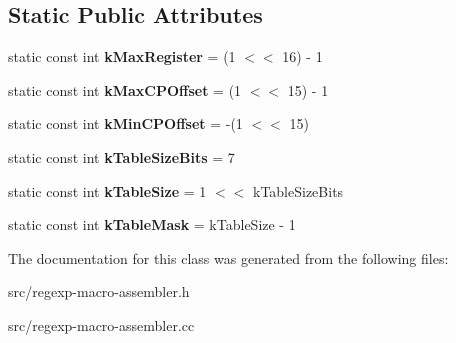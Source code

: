 \subsection*{Static Public Attributes}
\begin{DoxyCompactItemize}
\item 
\hypertarget{classv8_1_1internal_1_1_reg_exp_macro_assembler_aab3ae21c4255e84293d23f61d9916cbf}{}static const int {\bfseries k\+Max\+Register} = (1 $<$$<$ 16) -\/ 1\label{classv8_1_1internal_1_1_reg_exp_macro_assembler_aab3ae21c4255e84293d23f61d9916cbf}

\item 
\hypertarget{classv8_1_1internal_1_1_reg_exp_macro_assembler_ab05cfb65132cef288534e395a058d773}{}static const int {\bfseries k\+Max\+C\+P\+Offset} = (1 $<$$<$ 15) -\/ 1\label{classv8_1_1internal_1_1_reg_exp_macro_assembler_ab05cfb65132cef288534e395a058d773}

\item 
\hypertarget{classv8_1_1internal_1_1_reg_exp_macro_assembler_a70bb0c9a038cdaff24b24f4af8fd9586}{}static const int {\bfseries k\+Min\+C\+P\+Offset} = -\/(1 $<$$<$ 15)\label{classv8_1_1internal_1_1_reg_exp_macro_assembler_a70bb0c9a038cdaff24b24f4af8fd9586}

\item 
\hypertarget{classv8_1_1internal_1_1_reg_exp_macro_assembler_a8718bcee67dbdf905a30f8e81dfce44f}{}static const int {\bfseries k\+Table\+Size\+Bits} = 7\label{classv8_1_1internal_1_1_reg_exp_macro_assembler_a8718bcee67dbdf905a30f8e81dfce44f}

\item 
\hypertarget{classv8_1_1internal_1_1_reg_exp_macro_assembler_aed8b41d2ad7dc04d332f8051017a12ea}{}static const int {\bfseries k\+Table\+Size} = 1 $<$$<$ k\+Table\+Size\+Bits\label{classv8_1_1internal_1_1_reg_exp_macro_assembler_aed8b41d2ad7dc04d332f8051017a12ea}

\item 
\hypertarget{classv8_1_1internal_1_1_reg_exp_macro_assembler_a9337d4910330fb9eb954b2b5e2ae933f}{}static const int {\bfseries k\+Table\+Mask} = k\+Table\+Size -\/ 1\label{classv8_1_1internal_1_1_reg_exp_macro_assembler_a9337d4910330fb9eb954b2b5e2ae933f}

\end{DoxyCompactItemize}


The documentation for this class was generated from the following files\+:\begin{DoxyCompactItemize}
\item 
src/regexp-\/macro-\/assembler.\+h\item 
src/regexp-\/macro-\/assembler.\+cc\end{DoxyCompactItemize}
